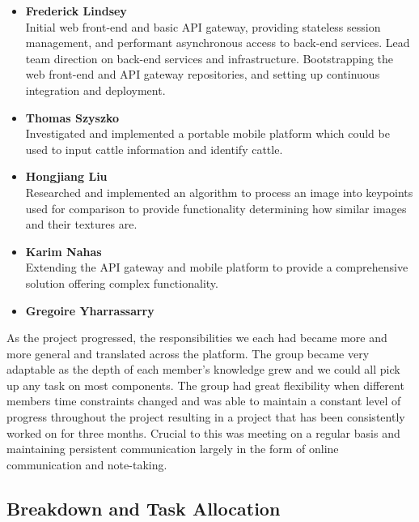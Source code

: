 \begin{itemize}
	\item	\textbf{Frederick Lindsey} \\
		  	Initial web front-end and basic API gateway, providing stateless session management, and performant asynchronous access to back-end services. Lead team direction on back-end services and infrastructure.
		  	Bootstrapping the web front-end and API gateway repositories, and setting up continuous integration and deployment.
	\item 	\textbf{Thomas Szyszko} \\
		  	Investigated and implemented a portable mobile platform which could be used to input cattle information and identify cattle.
		  	
	\item 	\textbf{Hongjiang Liu} \\
	 	  	Researched and implemented an algorithm to process an image into keypoints used for comparison to provide functionality determining how similar images and their textures are.
	\item	\textbf{Karim Nahas} \\
			Extending the API gateway and mobile platform to provide a comprehensive solution offering complex functionality.
	\item	\textbf{Gregoire Yharrassarry} \\
			
			
\end{itemize}

As the project progressed, the responsibilities we each had became more and more general and translated across the platform. The group became very adaptable as the depth of each member's knowledge grew and we could all pick up any task on most components. The group had great flexibility when different members time constraints changed and was able to maintain a constant level of progress throughout the project resulting in a project that has been consistently worked on for three months. Crucial to this was meeting on a regular basis and maintaining persistent communication largely in the form of online communication and note-taking.


\subsection{Breakdown and Task Allocation}


